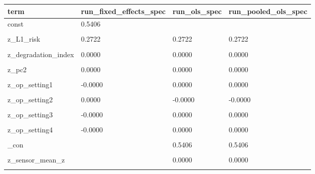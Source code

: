 \begin{tabular}{llll}
\toprule
term & run\_fixed\_effects\_spec & run\_ols\_spec & run\_pooled\_ols\_spec \\
\midrule
const & 0.5406 &  &  \\
 &  &  &  \\
z\_L1\_risk & 0.2722 & 0.2722 & 0.2722 \\
 &  &  &  \\
z\_degradation\_index & 0.0000 & 0.0000 & 0.0000 \\
 &  &  &  \\
z\_pc2 & 0.0000 & 0.0000 & 0.0000 \\
 &  &  &  \\
z\_op\_setting1 & -0.0000 & 0.0000 & 0.0000 \\
 &  &  &  \\
z\_op\_setting2 & 0.0000 & -0.0000 & -0.0000 \\
 &  &  &  \\
z\_op\_setting3 & -0.0000 & 0.0000 & 0.0000 \\
 &  &  &  \\
z\_op\_setting4 & -0.0000 & 0.0000 & 0.0000 \\
 &  &  &  \\
\_con &  & 0.5406 & 0.5406 \\
 &  &  &  \\
z\_sensor\_mean\_z &  & 0.0000 & 0.0000 \\
 &  &  &  \\
\bottomrule
\end{tabular}
